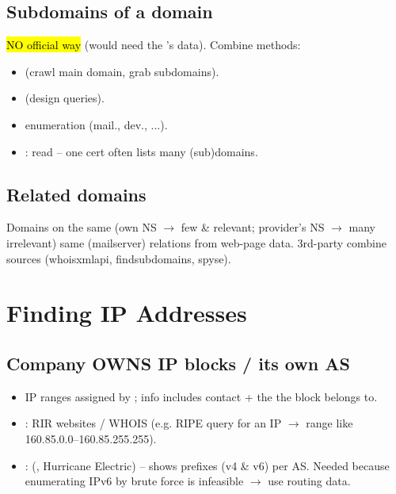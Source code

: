 \subsection{Subdomains of a domain}
\hl{NO official way} (would need the 's data). Combine  methods:
\begin{itemize}
\item {} (crawl main domain, grab subdomains).
\item {} (design queries).
\item {} enumeration (mail., dev., ...).
\item {}: read  -- one cert often lists many (sub)domains.
\end{itemize}

\subsection{Related domains}
Domains on the  \textbullet{} same  (own NS $\to$ few \& relevant; provider's NS $\to$ many irrelevant) \textbullet{} same  (mailserver) \textbullet{} relations from web-page data. 3rd-party combine sources (whoisxmlapi, findsubdomains, spyse). 

\section{Finding IP Addresses}

\subsection{Company OWNS IP blocks / its own AS}
\begin{itemize}
\item IP ranges assigned by ; info includes contact + the  the block belongs to.
\item {}: RIR websites / WHOIS (e.g. RIPE query for an IP $\to$  range like 160.85.0.0--160.85.255.255).
\item {}:  (, Hurricane Electric) -- shows prefixes (v4 \& v6) per AS. Needed because enumerating IPv6 by brute force is infeasible $\to$ use  routing data.
\end{itemize}

